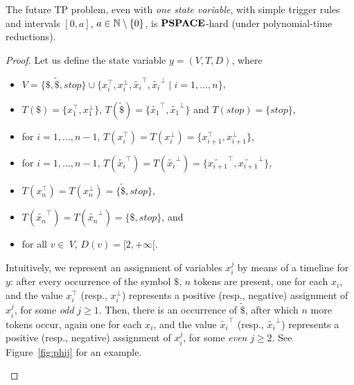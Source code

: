 \begin{theorem}\label{theorem:PSPlowerBound} 
The future TP problem, even with \emph{one state variable}, with simple trigger rules and intervals $[0,a]$, $a\in\mathbb{N}\setminus\{0\}$, is $\textbf{PSPACE}$-hard  (under polynomial-time reductions).
\end{theorem}
\begin{proof}
Let us define the state variable $y=(V,T,D)$, where 
\begin{itemize}
    \item $V=\{\$,\tilde{\$},stop\}\cup \{x_i^\top,x_i^\bot, \tilde{x_i}^\top, \tilde{x_i}^\bot \mid i=1,\ldots, n\}$,
    \item $T(\$)=\{x_1^\top,x_1^\bot\}$, $T(\tilde{\$})=\{\tilde{x_1}^\top, \tilde{x_1}^\bot\}$ and $T(stop)=\{stop\}$,
    \item for $i=1,\ldots, n-1$, $T(x_i^\top)=T(x_i^\bot)=\{x_{i+1}^\top,x_{i+1}^\bot\}$,
    \item for $i=1,\ldots, n-1$, $T(\tilde{x_i}^\top)=T(\tilde{x_i}^\bot)=\{\tilde{x_{i+1}}^\top,\tilde{x_{i+1}}^\bot\}$,
    \item $T(x_n^\top)=T(x_n^\bot)=\{\tilde{\$},stop\}$,
    \item $T(\tilde{x_n}^\top)=T(\tilde{x_n}^\bot)=\{\$,stop\}$, and
    \item for all $v\in\ V$, $D(v)=[2,+\infty[$.
\end{itemize}
%
Intuitively, we represent an assignment of variables $x_i^j$ by means of a timeline for $y$:
after every occurrence of the symbol $\$$, $n$ tokens are present, one for each $x_i$, and the value $x_i^\top$ (resp., $x_i^\bot$) represents a positive (resp., negative) assignment of $x_i^j$, for some \emph{odd} $j\geq 1$. Then, there is an occurrence of $\tilde{\$}$, after which $n$ more tokens occur, again one for each $x_i$, and the value $\tilde{x_i}^\top$ (resp., $\tilde{x_i}^\bot$) represents a positive (resp., negative) assignment of $x_i^j$, for some \emph{even} $j\geq 2$.
See Figure~\ref{fig:phij} for an example.
\begin{figure}[t]
    \centering

\end{figure}
\end{proof}

